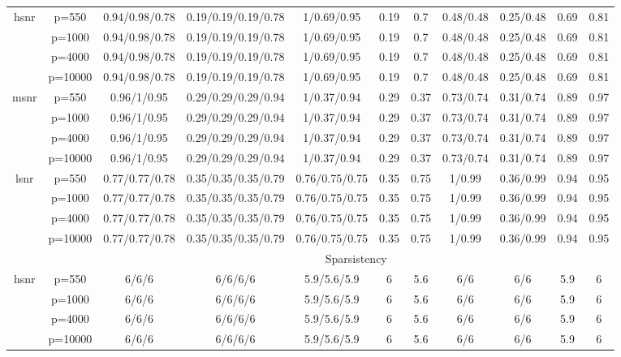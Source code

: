 \begin{table}[ht]
{\begin{tabular}{|c|c|ccccccccc|}
\midrule\multirow{4}[2]{*}{hsnr} & p=550 & 0.94/0.98/0.78 & 0.19/0.19/0.19/0.78 & 1/0.69/0.95 & 0.19 & 0.7 & 0.48/0.48 & 0.25/0.48 & 0.69 & 0.81 \\ 
   & p=1000 & 0.94/0.98/0.78 & 0.19/0.19/0.19/0.78 & 1/0.69/0.95 & 0.19 & 0.7 & 0.48/0.48 & 0.25/0.48 & 0.69 & 0.81 \\ 
   & p=4000 & 0.94/0.98/0.78 & 0.19/0.19/0.19/0.78 & 1/0.69/0.95 & 0.19 & 0.7 & 0.48/0.48 & 0.25/0.48 & 0.69 & 0.81 \\ 
   & p=10000 & 0.94/0.98/0.78 & 0.19/0.19/0.19/0.78 & 1/0.69/0.95 & 0.19 & 0.7 & 0.48/0.48 & 0.25/0.48 & 0.69 & 0.81 \\ 
  \midrule\multirow{4}[2]{*}{msnr} & p=550 & 0.96/1/0.95 & 0.29/0.29/0.29/0.94 & 1/0.37/0.94 & 0.29 & 0.37 & 0.73/0.74 & 0.31/0.74 & 0.89 & 0.97 \\ 
   & p=1000 & 0.96/1/0.95 & 0.29/0.29/0.29/0.94 & 1/0.37/0.94 & 0.29 & 0.37 & 0.73/0.74 & 0.31/0.74 & 0.89 & 0.97 \\ 
   & p=4000 & 0.96/1/0.95 & 0.29/0.29/0.29/0.94 & 1/0.37/0.94 & 0.29 & 0.37 & 0.73/0.74 & 0.31/0.74 & 0.89 & 0.97 \\ 
   & p=10000 & 0.96/1/0.95 & 0.29/0.29/0.29/0.94 & 1/0.37/0.94 & 0.29 & 0.37 & 0.73/0.74 & 0.31/0.74 & 0.89 & 0.97 \\ 
  \midrule\multirow{4}[2]{*}{lsnr} & p=550 & 0.77/0.77/0.78 & 0.35/0.35/0.35/0.79 & 0.76/0.75/0.75 & 0.35 & 0.75 & 1/0.99 & 0.36/0.99 & 0.94 & 0.95 \\ 
   & p=1000 & 0.77/0.77/0.78 & 0.35/0.35/0.35/0.79 & 0.76/0.75/0.75 & 0.35 & 0.75 & 1/0.99 & 0.36/0.99 & 0.94 & 0.95 \\ 
   & p=4000 & 0.77/0.77/0.78 & 0.35/0.35/0.35/0.79 & 0.76/0.75/0.75 & 0.35 & 0.75 & 1/0.99 & 0.36/0.99 & 0.94 & 0.95 \\ 
   & p=10000 & 0.77/0.77/0.78 & 0.35/0.35/0.35/0.79 & 0.76/0.75/0.75 & 0.35 & 0.75 & 1/0.99 & 0.36/0.99 & 0.94 & 0.95 \\ 
   \midrule 
 \multicolumn{1}{|c}{} &       & \multicolumn{9}{c|}{Sparsistency} \\
\midrule\multirow{4}[2]{*}{hsnr} & p=550 & 6/6/6 & 6/6/6/6 & 5.9/5.6/5.9 & 6 & 5.6 & 6/6 & 6/6 & 5.9 & 6 \\ 
   & p=1000 & 6/6/6 & 6/6/6/6 & 5.9/5.6/5.9 & 6 & 5.6 & 6/6 & 6/6 & 5.9 & 6 \\ 
   & p=4000 & 6/6/6 & 6/6/6/6 & 5.9/5.6/5.9 & 6 & 5.6 & 6/6 & 6/6 & 5.9 & 6 \\ 
   & p=10000 & 6/6/6 & 6/6/6/6 & 5.9/5.6/5.9 & 6 & 5.6 & 6/6 & 6/6 & 5.9 & 6 \\ 

\end{tabular}}
\end{table}
